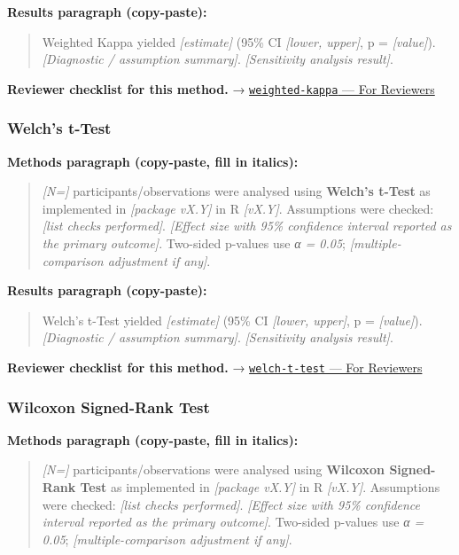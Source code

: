 \documentclass[
]{article}
\begin{document}
\textbf{Results paragraph (copy-paste):}

\begin{quote}
Weighted Kappa yielded \emph{{[}estimate{]}} (95\% CI \emph{{[}lower,
upper{]}}, p = \emph{{[}value{]}}). \emph{{[}Diagnostic / assumption
summary{]}}. \emph{{[}Sensitivity analysis result{]}}.
\end{quote}

\textbf{Reviewer checklist for this method.} →
\href{../chapters/14-clinical/weighted-kappa.Rmd\#for-reviewers}{\texttt{weighted-kappa}
--- For Reviewers}

\subsubsection{Welch's t-Test}\label{welchs-t-test}

\textbf{Methods paragraph (copy-paste, fill in italics):}

\begin{quote}
\emph{{[}N={]}} participants/observations were analysed using
\textbf{Welch's t-Test} as implemented in \emph{{[}package vX.Y{]}} in R
\emph{{[}vX.Y{]}}. Assumptions were checked: \emph{{[}list checks
performed{]}}. \emph{{[}Effect size with 95\% confidence interval
reported as the primary outcome{]}}. Two-sided p-values use \emph{α =
0.05}; \emph{{[}multiple-comparison adjustment if any{]}}.
\end{quote}

\textbf{Results paragraph (copy-paste):}

\begin{quote}
Welch's t-Test yielded \emph{{[}estimate{]}} (95\% CI \emph{{[}lower,
upper{]}}, p = \emph{{[}value{]}}). \emph{{[}Diagnostic / assumption
summary{]}}. \emph{{[}Sensitivity analysis result{]}}.
\end{quote}

\textbf{Reviewer checklist for this method.} →
\href{../chapters/04-inferential/welch-t-test.Rmd\#for-reviewers}{\texttt{welch-t-test}
--- For Reviewers}

\subsubsection{Wilcoxon Signed-Rank
Test}\label{wilcoxon-signed-rank-test}

\textbf{Methods paragraph (copy-paste, fill in italics):}

\begin{quote}
\emph{{[}N={]}} participants/observations were analysed using
\textbf{Wilcoxon Signed-Rank Test} as implemented in \emph{{[}package
vX.Y{]}} in R \emph{{[}vX.Y{]}}. Assumptions were checked: \emph{{[}list
checks performed{]}}. \emph{{[}Effect size with 95\% confidence interval
reported as the primary outcome{]}}. Two-sided p-values use \emph{α =
0.05}; \emph{{[}multiple-comparison adjustment if any{]}}.
\end{quote}
\end{document}
